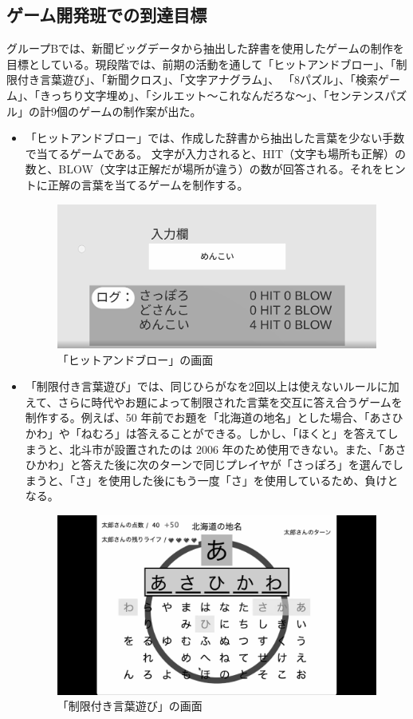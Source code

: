 \subsection{ゲーム開発班での到達目標}
グループBでは、新聞ビッグデータから抽出した辞書を使用したゲームの制作を目標としている。現段階では、前期の活動を通して「ヒットアンドブロー」、「制限付き言葉遊び」、「新聞クロス」、「文字アナグラム」、
「8パズル」、「検索ゲーム」、「きっちり文字埋め」、「シルエット～これなんだろな～」、「センテンスパズル」の計9個のゲームの制作案が出た。
\begin{itemize}
    \item 「ヒットアンドブロー」では、作成した辞書から抽出した言葉を少ない手数で当てるゲームである。    文字が入力されると、HIT（文字も場所も正解）の数と、BLOW（文字は正解だが場所が違う）の数が回答される。それをヒントに正解の言葉を当てるゲームを制作する。
\begin{figure}[htbp]
    \centering
    \includegraphics[keepaspectratio, scale=0.3]{images/Project_picuture2.png}
    \caption{「ヒットアンドブロー」の画面}
\end{figure}
\newpage
    \item 「制限付き言葉遊び」では、同じひらがなを2回以上は使えないルールに加えて、さらに時代やお題によって制限された言葉を交互に答え合うゲームを制作する。例えば、50 年前でお題を「北海道の地名」とした場合、「あさひかわ」や「ねむろ」は答えることができる。しかし、「ほくと」を答えてしまうと、北斗市が設置されたのは 2006 年のため使用できない。また、「あさひかわ」と答えた後に次のターンで同じプレイヤが「さっぽろ」を選んでしまうと、「さ」を使用した後にもう一度「さ」を使用しているため、負けとなる。
\begin{figure}[htbp]
    \centering
    \includegraphics[keepaspectratio, scale=0.2]{images/Project_picuture1.png}
    \caption{「制限付き言葉遊び」の画面}
\end{figure}


\end{itemize}
